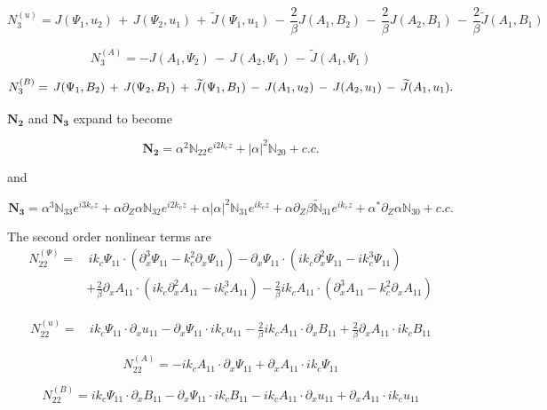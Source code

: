 \documentclass{emulateapj}
\newcommand{\beq}{\begin{equation}}
\newcommand{\eeq}{\end{equation}}
\begin{document}
\beq
N_3^{(u)} = J(\Psi_1, u_2) \, + \, J(\Psi_2, u_1) \, + \, \widetilde{J}(\Psi_1, u_1) \, - \, \frac{2}{\beta} J(A_1, B_2) \, - \, \frac{2}{\beta} J(A_2, B_1) \, - \, \frac{2}{\beta} \widetilde{J}(A_1, B_1)
\eeq

\beq
N_3^{(A)} = - J(A_1, \Psi_2) \, - \, J(A_2, \Psi_1) \, - \, \widetilde{J}(A_1, \Psi_1)
\eeq

\beq
N_3^{(B)} = \, J(\Psi_1, B_2) \, + \, J(\Psi_2, B_1) \, + \, \widetilde{J}(\Psi_1, B_1) \, - \, J(A_1, u_2) \, - \,  J(A_2, u_1) \, - \, \widetilde{J}(A_1, u_1).\\
\eeq

$\mathbf{N_2}$ and $\mathbf{N_3}$ expand to become

\beq
\mathbf{N_2} = \alpha^2\mathbb{N}_{22} e^{i2 k_c z} + \left|\alpha\right|^2 \mathbb{N}_{20} + c.c.
\eeq

and

\beq
\mathbf{N_3} = \alpha^3 \mathbb{N}_{33} e^{i 3 k_c z} + \alpha\partial_Z\alpha \mathbb{N}_{32} e^{i 2 k_c z} + \alpha\left|\alpha\right|^2 \mathbb{N}_{31} e^{i k_c z} + \alpha \partial_Z  \beta \mathbb{\widetilde{N}}_{31} e^{i k_c z} + \alpha^*\partial_Z \alpha \mathbb{N}_{30} + c.c.
\eeq

The second order nonlinear terms are \\

\beq
\begin{split}
N_{22}^{(\Psi)} = & \, i k_c \Psi_{11} \cdot \left(\partial_x^3 \Psi_{11} - k_c^2 \partial_x \Psi_{11}\right) - \partial_x \Psi_{11} \cdot \left(i k_c \partial_x^2 \Psi_{11} - i k_c^3 \Psi_{11}\right) \\
& + \frac{2}{\beta}\partial_x A_{11} \cdot \left(i k_c \partial_x^2 A_{11} - i k_c^3 A_{11}\right) - \frac{2}{\beta} i k_c A_{11} \cdot \left(\partial_x^3 A_{11} - k_c^2 \partial_x A_{11}\right)
\end{split}
\eeq

\beq
\begin{split}
N_{22}^{(u)} = & \, i k_c \Psi_{11} \cdot \partial_x u_{11} - \partial_x \Psi_{11} \cdot i k_c u_{11} - \frac{2}{\beta} i k_c A_{11} \cdot \partial_x B_{11} + \frac{2}{\beta} \partial_x A_{11} \cdot i k_c B_{11}
\end{split}
\eeq

\beq
N_{22}^{(A)} = - i k_c A_{11} \cdot \partial_x \Psi_{11} + \partial_x A_{11} \cdot i k_c \Psi_{11}
\eeq

\beq
N_{22}^{(B)} = i k_c \Psi_{11} \cdot \partial_x B_{11} - \partial_x \Psi_{11} \cdot i k_c B_{11} - i k_c A_{11} \cdot \partial_x u_{11} + \partial_x A_{11} \cdot i k_c u_{11}
\eeq
\end{document}
